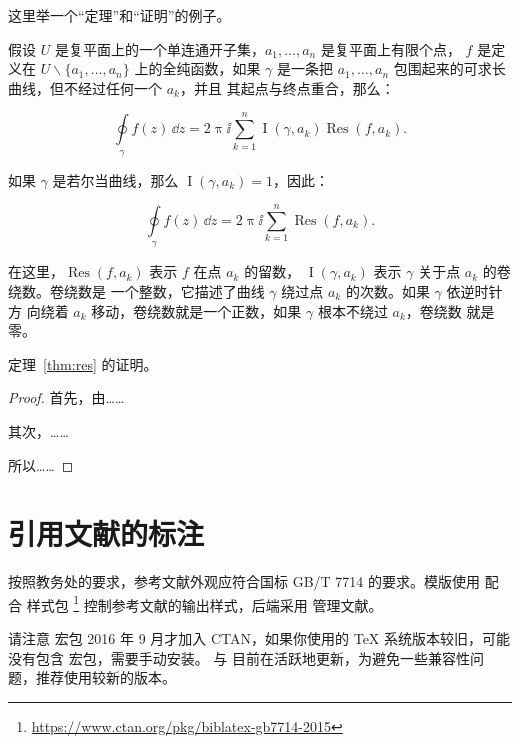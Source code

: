 这里举一个“定理”和“证明”的例子。
\begin{theorem}[留数定理]
\label{thm:res}
  假设 $U$ 是复平面上的一个单连通开子集，$a_1, \ldots, a_n$ 是复平面上有限个点，
  $f$ 是定义在 $U \backslash \{a_1, \ldots, a_n\}$ 上的全纯函数，如果 $\gamma$
  是一条把 $a_1, \ldots, a_n$ 包围起来的可求长曲线，但不经过任何一个 $a_k$，并且
  其起点与终点重合，那么：

  \begin{equation}
    \label{eq:res}
    \oint\limits_\gamma f(z)\, \dd z = 2\uppi \ii \sum_{k=1}^n \operatorname{I}(\gamma, a_k) \operatorname{Res}(f, a_k).
  \end{equation}

  如果 $\gamma$ 是若尔当曲线，那么 $\operatorname{I}(\gamma, a_k) = 1$，因此：

  \begin{equation}
    \label{eq:resthm}
    \oint\limits_\gamma f(z)\, \dd z = 2\uppi \ii \sum_{k=1}^n \operatorname{Res}(f, a_k).
  \end{equation}

  在这里，$\operatorname{Res}(f, a_k)$ 表示 $f$ 在点 $a_k$ 的留数，
  $\operatorname{I}(\gamma, a_k)$ 表示 $\gamma$ 关于点 $a_k$ 的卷绕数。卷绕数是
  一个整数，它描述了曲线 $\gamma$ 绕过点 $a_k$ 的次数。如果 $\gamma$ 依逆时针方
  向绕着 $a_k$ 移动，卷绕数就是一个正数，如果 $\gamma$ 根本不绕过 $a_k$，卷绕数
  就是零。

  定理~\ref{thm:res} 的证明。

  \begin{proof}
    首先，由……

    其次，……

    所以……
  \end{proof}
\end{theorem}

\section{引用文献的标注}

按照教务处的要求，参考文献外观应符合国标 GB/T 7714 的要求。模版使用 \BibLaTeX{}
配合  样式包%
\footnote{\url{https://www.ctan.org/pkg/biblatex-gb7714-2015}}%
控制参考文献的输出样式，后端采用  管理文献。

请注意  宏包 2016 年 9 月才加入 CTAN，如果你使用的
\TeX{} 系统版本较旧，可能没有包含  宏包，需要手动安装。
\BibLaTeX{} 与  目前在活跃地更新，为避免一些兼容性问
题，推荐使用较新的版本。

